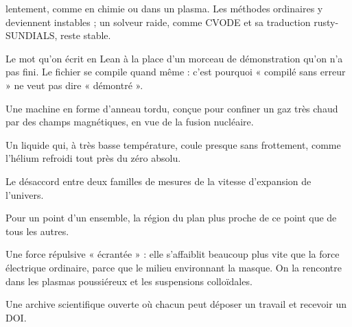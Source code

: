 \begin{description}[style=nextline,leftmargin=0pt,font=\normalfont\sffamily\bfseries\color{okbleu},itemsep=5pt]
lentement, comme en chimie ou dans un plasma. Les méthodes ordinaires y deviennent instables ; un solveur raide, comme
CVODE et sa traduction rusty-SUNDIALS, reste stable.
\item[sorry] Le mot qu'on écrit en Lean à la place d'un morceau de démonstration qu'on n'a pas fini. Le fichier se
compile quand même : c'est pourquoi « compilé sans erreur » ne veut pas dire « démontré ».
\item[Stellarator] Une machine en forme d'anneau tordu, conçue pour confiner un gaz très chaud par des champs
magnétiques, en vue de la fusion nucléaire.
\item[Superfluide] Un liquide qui, à très basse température, coule presque sans frottement, comme l'hélium
refroidi tout près du zéro absolu.
\item[Tension de Hubble] Le désaccord entre deux familles de mesures de la vitesse d'expansion de l'univers.
\item[Voronoï (cellule de)] Pour un point d'un ensemble, la région du plan plus proche de ce point que de tous les
autres.
\item[Yukawa (force de)] Une force répulsive « écrantée » : elle s'affaiblit beaucoup plus vite que la force
électrique ordinaire, parce que le milieu environnant la masque. On la rencontre dans les plasmas poussiéreux et les
suspensions colloïdales.
\item[Zenodo] Une archive scientifique ouverte où chacun peut déposer un travail et recevoir un DOI.
\end{description}
